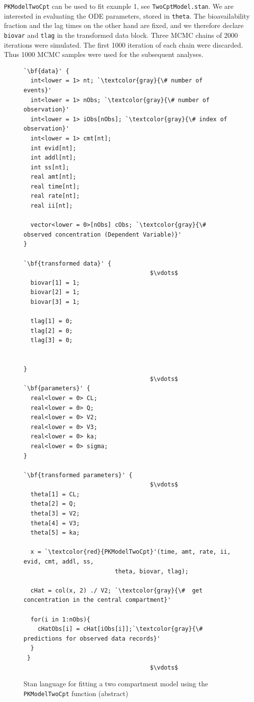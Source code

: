 \documentclass[11pt]{amsart}
\newenvironment{fmpage}[1]
     {\begin{lrbox}{\fmbox}\begin{minipage}{#1}}
     {\end{minipage}\end{lrbox}\fbox{\usebox{\fmbox}}}
\begin{document}
\texttt{PKModelTwoCpt} can be used to fit example 1, see \texttt{TwoCptModel.stan}. We are interested in evaluating the ODE parameters, stored in \texttt{theta}. The bioavailability fraction and the lag times on the other hand are fixed, and we therefore declare \texttt{biovar} and \texttt{tlag} in the transformed data block. Three MCMC chains of 2000 iterations were simulated. The first 1000 iteration of each chain were discarded. Thus 1000 MCMC samples were used for the subsequent analyses.

\begin{figure}[htbp]
\caption{Stan language for fitting a two compartment model using the \texttt{PKModelTwoCpt} function (abstract)}
\begin{center}
\begin{small}
\begin{fmpage}{\textwidth - .75in}
\begin{lstlisting}[basicstyle=\footnotesize\ttfamily,mathescape=true,flexiblecolumns=true,frame=single,escapeinside=`']
`\bf{data}' {
  int<lower = 1> nt; `\textcolor{gray}{\# number of events}'
  int<lower = 1> nObs; `\textcolor{gray}{\# number of observation}'
  int<lower = 1> iObs[nObs]; `\textcolor{gray}{\# index of observation}'
  int<lower = 1> cmt[nt];
  int evid[nt];
  int addl[nt];
  int ss[nt];
  real amt[nt];
  real time[nt];
  real rate[nt];
  real ii[nt];
  
  vector<lower = 0>[nObs] cObs; `\textcolor{gray}{\#  observed concentration (Dependent Variable)}'
}

`\bf{transformed data}' {
                                    $\vdots$
  biovar[1] = 1;
  biovar[2] = 1;
  biovar[3] = 1;
  
  tlag[1] = 0;
  tlag[2] = 0;
  tlag[3] = 0;                                    
                                    
                                     
}
                                    $\vdots$ 
`\bf{parameters}' {
  real<lower = 0> CL;
  real<lower = 0> Q;
  real<lower = 0> V2;
  real<lower = 0> V3;
  real<lower = 0> ka;
  real<lower = 0> sigma;
}

`\bf{transformed parameters}' {
                                    $\vdots$ 
  theta[1] = CL;
  theta[2] = Q;
  theta[3] = V2;
  theta[4] = V3;
  theta[5] = ka;

  x = `\textcolor{red}{PKModelTwoCpt}'(time, amt, rate, ii, evid, cmt, addl, ss, 
                          theta, biovar, tlag);

  cHat = col(x, 2) ./ V2; `\textcolor{gray}{\#  get concentration in the central compartment}'

  for(i in 1:nObs){
    cHatObs[i] = cHat[iObs[i]];`\textcolor{gray}{\# predictions for observed data records}'
  }
 }
                                    $\vdots$ 
\end{lstlisting}
\end{fmpage}
\end{small}
\end{center}
\label{TwoCptCode}
\end{figure}
\end{document}
